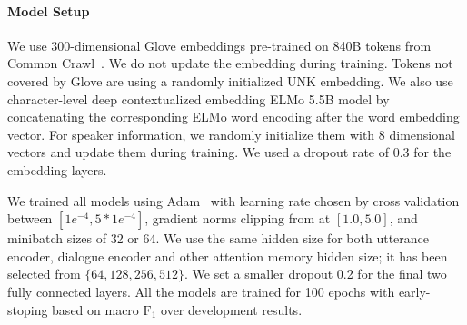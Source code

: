 
\paragraph{Model Setup}

We use 300-dimensional Glove embeddings pre-trained on 840B tokens
from Common Crawl~\cite{pennington2014glove}. We do not update the
embedding during training. Tokens not covered by Glove are using a
randomly initialized UNK embedding. We also use character-level deep
contextualized embedding ELMo 5.5B model by concatenating the
corresponding ELMo word encoding after the word embedding
vector. For speaker information, we randomly initialize them with 8
dimensional vectors and update them during training. We used a
dropout rate of 0.3 for the embedding layers.


We trained all models using Adam~\cite{kingma2014adam} with learning
rate chosen by cross validation between $[1e^{-4}, 5*1e^{-4}]$,
gradient norms clipping from at $[1.0, 5.0]$, and minibatch sizes of
32 or 64. We use the same hidden size for both utterance encoder,
dialogue encoder and other attention memory hidden size; it has been
selected from $\{64, 128, 256, 512\}$. We set a smaller dropout 0.2
for the final two fully connected layers. All the models are trained
for 100 epochs with early-stoping based on macro $\text{F}_{1}$ over development
results. 


